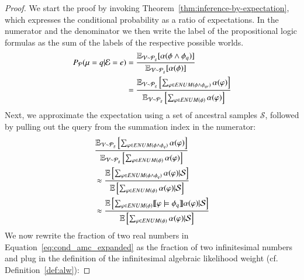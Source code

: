 \begin{proof}
    We start the proof by invoking Theorem~\ref{thm:inference-by-expectation}, which expresses the conditional probability as a ratio of expectations. In the numerator and the denominator we then write the label of the propositional logic formulas as the sum of the labels of the respective possible worlds.
    \begin{align}
        P_\mathcal{P}(\mu=q|\mathcal{E}=e)  \label{eq:cond_amc_1}
         & =\frac{\operatorname*{\mathbb{E}}_{\mathcal{V} \sim  \mathcal{P}_g} [\alpha( \phi \wedge \phi_q)] }{\operatorname*{\mathbb{E}}_{\mathcal{V} \sim  \mathcal{P}_g} [\alpha( \phi )] } \\
         & =
        \frac
        {
            \operatorname*{\mathbb{E}}_{\mathcal{V} \sim  \mathcal{P}_g} \left[ \sum_{\varphi\in ENUM(\phi \land \phi_{q e}) } \alpha(\varphi) \right]
        }
        {
            \operatorname*{\mathbb{E}}_{\mathcal{V}\sim  \mathcal{P}_g} \left[ \sum_{\varphi\in ENUM(\phi) } \alpha(\varphi)  \right]
        }  \label{eq:cond_amc_2}
    \end{align}
    Next, we approximate the expectation using a set of ancestral samples $\mathcal{S}$, followed by pulling out the query from the summation index in the numerator:
    \begin{align}
         & \frac
        {
            \operatorname*{\mathbb{E}}_{\mathcal{V} \sim  \mathcal{P}_g} \left[ \sum_{\varphi\in ENUM(\phi \land \phi_{q}) } \alpha(\varphi) \right]
        }
        {
            \operatorname*{\mathbb{E}}_{\mathcal{V} \sim  \mathcal{P}_g} \left[ \sum_{\varphi\in ENUM(\phi) } \alpha(\varphi)  \right]
        }
        \\
         & \approx
        \frac
        {
            \operatorname*{\mathbb{E}} \left[ \sum_{\varphi\in ENUM(\phi \land \phi_{q})   } \alpha(\varphi) |  \mathcal{S}  \right]
        }
        {
            \operatorname*{\mathbb{E}} \left[ \sum_{\varphi\in ENUM(\phi) } \alpha(\varphi) |  \mathcal{S}   \right]
        }  \label{eq:cond_amc_approx}
        \\
         & \approx
        \frac{
            \operatorname*{\mathbb{E}} \left[ \sum_{\varphi\in ENUM(\phi)   } \llbracket\varphi \models \phi_q\rrbracket \alpha(\varphi) |  \mathcal{S}  \right]
        }
        {
            \operatorname*{\mathbb{E}} \left[ \sum_{\varphi\in ENUM(\phi) } \alpha(\varphi) |  \mathcal{S}   \right]
        }
        \label{eq:cond_amc_expanded}
    \end{align}
    We now rewrite the fraction of two real numbers in Equation~\ref{eq:cond_amc_expanded} as the fraction of two infinitesimal numbers and plug in the definition of the infinitesimal algebraic likelihood weight (cf. Definition~\ref{def:alw}):

\end{proof}

